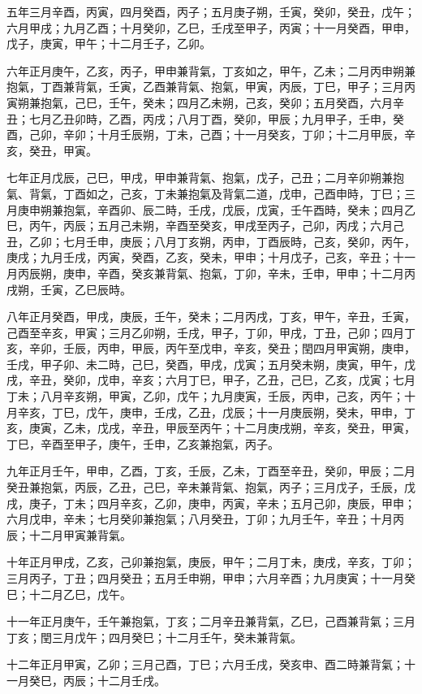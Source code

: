 \begin{pinyinscope}
五年三月辛酉，丙寅，四月癸酉，丙子；五月庚子朔，壬寅，癸卯，癸丑，戊午；六月甲戌；九月乙酉；十月癸卯，乙巳，壬戌至甲子，丙寅；十一月癸酉，甲申，戊子，庚寅，甲午；十二月壬子，乙卯。

六年正月庚午，乙亥，丙子，甲申兼背氣，丁亥如之，甲午，乙未；二月丙申朔兼抱氣，丁酉兼背氣，壬寅，乙酉兼背氣、抱氣，甲寅，丙辰，丁巳，甲子；三月丙寅朔兼抱氣，己巳，壬午，癸未；四月乙未朔，己亥，癸卯；五月癸酉，六月辛丑；七月乙丑卯時，乙酉，丙戌；八月丁酉，癸卯，甲辰；九月甲子，壬申，癸酉，己卯，辛卯；十月壬辰朔，丁未，己酉；十一月癸亥，丁卯；十二月甲辰，辛亥，癸丑，甲寅。

七年正月戊辰，己巳，甲戌，甲申兼背氣、抱氣，戊子，己丑；二月辛卯朔兼抱氣、背氣，丁酉如之，己亥，丁未兼抱氣及背氣二道，戊申，己酉申時，丁巳；三月庚申朔兼抱氣，辛酉卯、辰二時，壬戌，戊辰，戊寅，壬午酉時，癸未；四月乙巳，丙午，丙辰；五月己未朔，辛酉至癸亥，甲戌至丙子，己卯，丙戌；六月己丑，乙卯；七月壬申，庚辰；八月丁亥朔，丙申，丁酉辰時，己亥，癸卯，丙午，庚戌；九月壬戌，丙寅，癸酉，乙亥，癸未，甲申；十月戊子，己亥，辛丑；十一月丙辰朔，庚申，辛酉，癸亥兼背氣、抱氣，丁卯，辛未，壬申，甲申；十二月丙戌朔，壬寅，乙巳辰時。

八年正月癸酉，甲戌，庚辰，壬午，癸未；二月丙戌，丁亥，甲午，辛丑，壬寅，己酉至辛亥，甲寅；三月乙卯朔，壬戌，甲子，丁卯，甲戌，丁丑，己卯；四月丁亥，辛卯，壬辰，丙申，甲辰，丙午至戊申，辛亥，癸丑；閏四月甲寅朔，庚申，壬戌，甲子卯、未二時，己巳，癸酉，甲戌，戊寅；五月癸未朔，庚寅，甲午，戊戌，辛丑，癸卯，戊申，辛亥；六月丁巳，甲子，乙丑，己巳，乙亥，戊寅；七月丁未；八月辛亥朔，甲寅，乙卯，戊午；九月庚寅，壬辰，丙申，己亥，丙午；十月辛亥，丁巳，戊午，庚申，壬戌，乙丑，戊辰；十一月庚辰朔，癸未，甲申，丁亥，庚寅，乙未，戊戌，辛丑，甲辰至丙午；十二月庚戌朔，辛亥，癸丑，甲寅，丁巳，辛酉至甲子，庚午，壬申，乙亥兼抱氣，丙子。

九年正月壬午，甲申，乙酉，丁亥，壬辰，乙未，丁酉至辛丑，癸卯，甲辰；二月癸丑兼抱氣，丙辰，乙丑，己巳，辛未兼背氣、抱氣，丙子；三月戊子，壬辰，戊戌，庚子，丁未；四月辛亥，乙卯，庚申，丙寅，辛未；五月己卯，庚辰，甲申；六月戊申，辛未；七月癸卯兼抱氣；八月癸丑，丁卯；九月壬午，辛丑；十月丙辰；十二月甲寅兼背氣。

十年正月甲戌，乙亥，己卯兼抱氣，庚辰，甲午；二月丁未，庚戌，辛亥，丁卯；三月丙子，丁丑；四月癸丑；五月壬申朔，甲申；六月辛酉；九月庚寅；十一月癸巳；十二月乙巳，戊午。

十一年正月庚午，壬午兼抱氣，丁亥；二月辛丑兼背氣，乙巳，己酉兼背氣；三月丁亥；閏三月戊午；四月癸巳；十二月壬午，癸未兼背氣。

十二年正月甲寅，乙卯；三月己酉，丁巳；六月壬戌，癸亥申、酉二時兼背氣；十一月癸巳，丙辰；十二月壬戌。


\end{pinyinscope}
